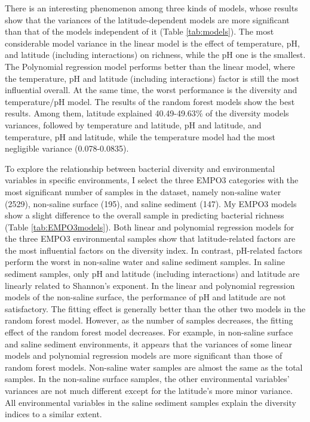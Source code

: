 \documentclass[11pt, a4paper]{article}
\begin{document}
\begin{spacing}{1.5}
There is an interesting phenomenon among three kinds of models, whose results show that the variances of the latitude-dependent models are more significant than that of the models independent of it (Table \ref{tab:models}). The  most considerable model variance in the linear model is the effect of temperature, pH, and latitude (including interactions) on richness, while the pH one is the smallest. The Polynomial regression model performs better than the linear model, where the temperature, pH and latitude (including interactions) factor is still the most influential overall. At the same time, the worst performance is the diversity and temperature/pH model. The results of the random forest models show the best results. Among them, latitude explained 40.49-49.63$\%$ of the diversity models variances, followed by temperature and latitude, pH and latitude, and temperature, pH and latitude, while the temperature model had the most negligible variance (0.078-0.0835). 

To explore the relationship between bacterial diversity and environmental variables in specific environments, I select the three EMPO3 categories with the most significant number of samples in the dataset, namely non-saline water (2529), non-saline surface (195), and saline sediment (147). My EMPO3 models show a slight difference to the overall sample in predicting bacterial richness (Table \ref{tab:EMPO3models}). Both linear and polynomial regression models for the three EMPO3 environmental samples show that latitude-related factors are the most influential factors on the diversity index. In contrast, pH-related factors perform the worst in non-saline water and saline sediment samples. In saline sediment samples, only pH and latitude (including interactions) and latitude are linearly related to Shannon's exponent. In the linear and polynomial regression models of the non-saline surface, the performance of pH and latitude are not satisfactory. The fitting effect is generally better than the other two models in the random forest model. However, as the number of samples decreases, the fitting effect of the random forest model decreases. For example, in non-saline surface and saline sediment environments, it appears that the variances of some linear models and polynomial regression models are more significant than those of random forest models. Non-saline water samples are almost the same as the total samples. In the non-saline surface samples, the other environmental variables’ variances are not much different except for the latitude's more minor variance. All environmental variables in the saline sediment samples explain the diversity indices to a similar extent.


\end{spacing}
\end{document}
